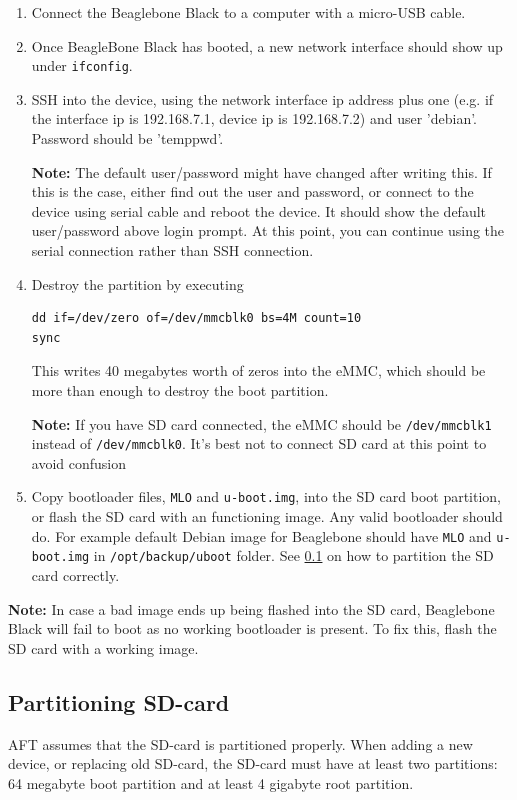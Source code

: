 \documentclass[a4paper,11pt]{article}
\newcommand{\note}{\textbf{Note: }}
\newcommand{\cmd}[1]{\texttt{#1}}
\begin{document}
\begin{enumerate}

\item Connect the Beaglebone Black to a computer with a micro-USB cable. 

\item Once BeagleBone Black has booted, a new network interface should show up under \cmd{ifconfig}.

\item SSH into the device, using the network interface ip address plus one (e.g. if the interface ip is 192.168.7.1, device ip is 192.168.7.2) and user 'debian'. Password should be 'temppwd'.

\note The default user/password might have changed after writing this. If this is the case, either find out the user and password, or connect to the device using serial cable and reboot the device. It should show the default user/password above login prompt. At this point, you can continue using the serial connection rather than SSH connection.

\item Destroy the partition by executing 

\begin{lstlisting}
dd if=/dev/zero of=/dev/mmcblk0 bs=4M count=10
sync
\end{lstlisting}

This writes 40 megabytes worth of zeros into the eMMC, which should be more than enough to destroy the boot partition.

\note If you have SD card connected, the eMMC should be \cmd{/dev/mmcblk1} instead of \cmd{/dev/mmcblk0}. It's best not to connect SD card at this point to avoid confusion

\item Copy bootloader files, \cmd{MLO} and \cmd{u-boot.img}, into the SD card boot partition, or flash the SD card with an functioning image. Any valid bootloader should do. For example default Debian image for Beaglebone should have \cmd{MLO} and \cmd{u-boot.img} in \cmd{/opt/backup/uboot} folder. See \ref{part_sd} on how to partition the SD card correctly.

\end{enumerate}

\note In case a bad image ends up being flashed into the SD card, Beaglebone Black will fail to boot as no working bootloader is present. To fix this, flash the SD card with a working image.

\subsection{Partitioning SD-card}
\label{part_sd}
AFT assumes that the SD-card is partitioned properly. When adding a new device, or replacing old SD-card, the SD-card must have at least two partitions: 64 megabyte boot partition and at least 4 gigabyte root partition.
\end{document}
